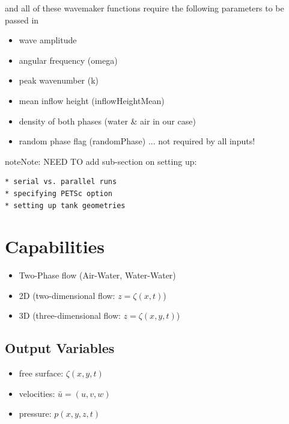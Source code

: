 \documentclass[letterpaper,12pt,english]{sphinxmanual}
\begin{document}
and all of these wavemaker functions require the following parameters to be passed in
\begin{itemize}
\item {} 
wave amplitude

\item {} 
angular frequency (omega)

\item {} 
peak wavenumber (k)

\item {} 
mean inflow height (inflowHeightMean)

\item {} 
density of both phases (water \& air in our case)

\item {} 
random phase flag (randomPhase) ... not required by all inputs!

\end{itemize}

\begin{notice}{note}{Note:}
NEED TO add sub-section on setting up:

\begin{Verbatim}[commandchars=\\\{\}]
* serial vs. parallel runs
* specifying PETSc option
* setting up tank geometries
\end{Verbatim}
\end{notice}


\chapter{Capabilities}
\label{index:capabilities-sec}\label{index:capabilities}\begin{itemize}
\item {} 
Two-Phase flow (Air-Water, Water-Water)

\item {} 
2D (two-dimensional flow:  $z = \zeta(x,t)$)

\item {} 
3D (three-dimensional flow:  $z = \zeta(x,y,t)$)

\end{itemize}


\section{Output Variables}
\label{index:output-variables}\begin{itemize}
\item {} 
free surface:  $\zeta(x,y,t)$

\item {} 
velocities:  $\bar{u} = (u,v,w)$

\item {} 
pressure:  $p(x,y,z,t)$

\end{itemize}
\end{document}
